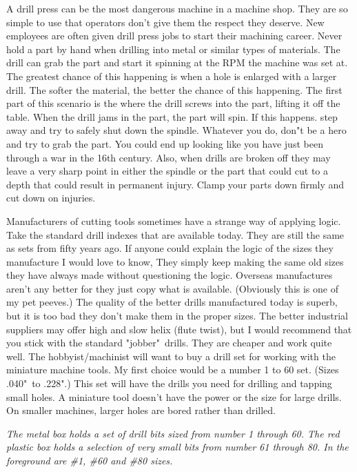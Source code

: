 A drill press can be the most dangerous machine in a machine shop. They are so
simple to use that operators don't give them the respect they deserve. New
employees are often given drill press jobs to start their machining career.
Never hold a part by hand when drilling into metal or similar types of
materials. The drill can grab the part and start it spinning at the RPM the
machine was set at. The greatest chance of this happening is when a hole is
enlarged with a larger drill. The softer the material, the better the chance of
this happening. The first part of this scenario is the where the drill screws
into the part, lifting it off the table. When the drill jams in the part, the
part will spin. If this happens. step away and try to safely shut down the
spindle. Whatever you do, don"t be a hero and try to grab the part. You could
end up looking like you have just been through a war in the 16th century. Also,
when drills are broken off they may leave a very sharp point in either the
spindle or the part that could cut to a depth that could result in permanent
injury. Clamp your parts down firmly and cut down on injuries.


Manufacturers of cutting tools sometimes have a strange way of applying logic.
Take the standard drill indexes that are available today. They are still the
same as sets from fifty years ago. If anyone could explain the logic of the
sizes they manufacture I would love to know, They simply keep making the same
old sizes they have always made without questioning the logic. Overseas
manufactures aren't any better for they just copy what is available. (Obviously
this is one of my pet peeves.) The quality of the better drills manufactured
today is superb, but it is too bad they don't make them in the proper sizes. The
better industrial suppliers may offer high and slow helix (flute twist), but I
would recommend that you stick with the standard "jobber"\ drills. They are
cheaper and work quite well. The hobbyist/machinist will want to buy a drill set
for working with the miniature machine tools. My first choice would be a number
1 to 60 set. (Sizes .040"\ to .228".) This set will have the drills you need for
drilling and tapping small holes. A miniature tool doesn't have the power or the
size for large drills. On smaller machines, larger holes are bored rather than
drilled.

\bigskip
\textit{The metal box holds a set of drill bits sized from number 1 through 60.
The red plastic box holds a selection of very small bits from number 61 through
80. In the foreground are \#1, \#60 and \#80 sizes.}
\bigskip

